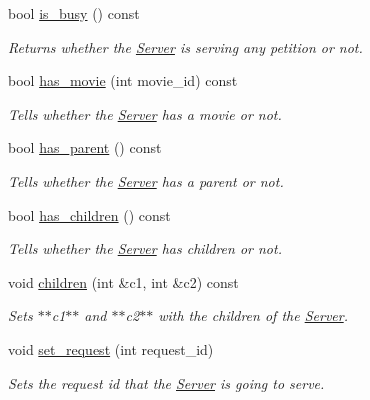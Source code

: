 \begin{DoxyCompactItemize}
bool \hyperlink{class_server_a1bfac1f0028aea71f89e64809937306a}{is\_\-busy} () const 
\begin{DoxyCompactList}\small\item\em Returns whether the \hyperlink{class_server}{Server} is serving any petition or not. \item\end{DoxyCompactList}\item 
bool \hyperlink{class_server_a92979104e897c899d44f9ab4a5931a95}{has\_\-movie} (int movie\_\-id) const 
\begin{DoxyCompactList}\small\item\em Tells whether the \hyperlink{class_server}{Server} has a movie or not. \item\end{DoxyCompactList}\item 
bool \hyperlink{class_server_a1aed1fb63af9b2d8a40459f5e51422c7}{has\_\-parent} () const 
\begin{DoxyCompactList}\small\item\em Tells whether the \hyperlink{class_server}{Server} has a parent or not. \item\end{DoxyCompactList}\item 
bool \hyperlink{class_server_aab357f6115e5a102d631a28e6c99658b}{has\_\-children} () const 
\begin{DoxyCompactList}\small\item\em Tells whether the \hyperlink{class_server}{Server} has children or not. \item\end{DoxyCompactList}\item 
void \hyperlink{class_server_a3e362f139ad82a6ad64f0c32965ead19}{children} (int \&c1, int \&c2) const 
\begin{DoxyCompactList}\small\item\em Sets $\ast$$\ast$c1$\ast$$\ast$ and $\ast$$\ast$c2$\ast$$\ast$ with the children of the \hyperlink{class_server}{Server}. \item\end{DoxyCompactList}\item 
void \hyperlink{class_server_a6d64170bbfd9374a2f46c3919a2bba9e}{set\_\-request} (int request\_\-id)
\begin{DoxyCompactList}\small\item\em Sets the request id that the \hyperlink{class_server}{Server} is going to serve. \item\end{DoxyCompactList}\item 

\end{DoxyCompactItemize}

